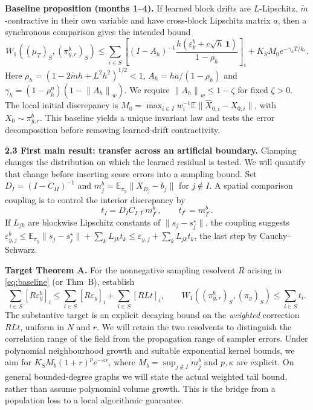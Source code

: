 \documentclass[12pt,a4paper]{article}
\newcommand{\E}{\mathbb E}
\newcommand{\W}{W_1}
\newcommand{\piy}{\pi_y}
\newcommand{\pir}{\pi_{y,r}^{b}}
\newcommand{\epsb}{\varepsilon^{b}_{y}}
\newcommand{\epsy}{\varepsilon_{y}}
\newcommand{\normw}[1]{\left\|#1\right\|_w}
\begin{document}
\textbf{Baseline proposition (months 1--4).} If learned block drifts are $L$-Lipschitz, $\widetilde m$-contractive in their own variable and have cross-block Lipschitz matrix $a$, then a synchronous comparison gives the intended bound
\begin{equation}\label{eq:baseline}
 \W((\mu_T)_S,(\pir)_S)
 \leq\sum_{i\in S}\left[(I-A_h)^{-1}
 \frac{h(\epsb+c\sqrt h\,\mathbf1)}{1-\rho_h}\right]_i
 +K_SM_0e^{-\gamma_h T/k_r}.
\end{equation}
Here $\rho_h=(1-2\widetilde mh+L^2h^2)^{1/2}<1$, $A_h=ha/(1-\rho_h)$ and $\gamma_h=(1-\rho_h^n)(1-\normw{A_h})$. We require $\normw{A_h}\leq1-\zeta$ for fixed $\zeta>0$. The local initial discrepancy is $M_0=\max_{i\in I}w_i^{-1}\E\|\widehat X_{0,i}-X_{0,i}\|$, with $X_0\sim\pir$. This baseline yields a unique invariant law and tests the error decomposition before removing learned-drift contractivity.

\textbf{2.3 First main result: transfer across an artificial boundary.}
Clamping changes the distribution on which the learned residual is tested. We will quantify that change before inserting score errors into a sampling bound. Set $D_I=(I-C_{II})^{-1}$ and $m_j^b=\E_{\piy}\|X_{B_j}-b_j\|$ for $j\notin I$. A spatial comparison coupling is to control the interior discrepancy by
\[
 t_I=D_I C_{I,I^c}m_{I^c}^b,\qquad t_{I^c}=m_{I^c}^b.
\]
If $L_{jk}$ are blockwise Lipschitz constants of $\|s_j-s_j^\star\|$, the coupling suggests $\varepsilon^b_{y,j}\leq\E_{\piy}\|s_j-s_j^\star\|+\sum_kL_{jk}t_k\leq\varepsilon_{y,j}+\sum_kL_{jk}t_k$, the last step by Cauchy--Schwarz.

\textbf{Target Theorem A.} For the nonnegative sampling resolvent $R$ arising in \eqref{eq:baseline} (or Thm~B), establish
\begin{equation}\label{eq:transfer}
 \sum_{i\in S}[R\epsb]_i
 \leq\sum_{i\in S}[R\epsy]_i+\sum_{i\in S}[RLt]_i,
 \qquad \W((\pir)_S,(\piy)_S)\leq\sum_{i\in S}t_i.
\end{equation}
The substantive target is an explicit decaying bound on the \emph{weighted} correction $RLt$, uniform in $N$ and $r$. We will retain the two resolvents to distinguish the correlation range of the field from the propagation range of sampler errors. Under polynomial neighbourhood growth and suitable exponential kernel bounds, we aim for $K_SM_b(1+r)^p e^{-\kappa r}$, where $M_b=\sup_{j\notin I}m_j^b$ and $p,\kappa$ are explicit. On general bounded-degree graphs we will state the actual weighted tail bound, rather than assume polynomial volume growth. This is the bridge from a population loss to a local algorithmic guarantee.
\end{document}
